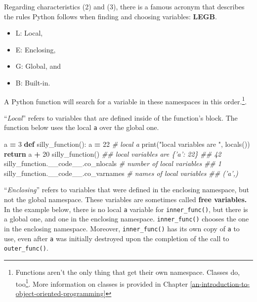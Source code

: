 \documentclass[12pt,krantz2]{krantz}
\makeatletter
\newenvironment{Shaded}{\begin{snugshade}}{\end{snugshade}}
\newcommand{\BuiltInTok}[1]{#1}
\newcommand{\CommentTok}[1]{\textcolor[rgb]{0.37,0.37,0.37}{\textit{#1}}}
\newcommand{\ControlFlowTok}[1]{\textcolor[rgb]{0.27,0.27,0.27}{\textbf{#1}}}
\newcommand{\DecValTok}[1]{\textcolor[rgb]{0.06,0.06,0.06}{#1}}
\newcommand{\KeywordTok}[1]{\textcolor[rgb]{0.27,0.27,0.27}{\textbf{#1}}}
\newcommand{\NormalTok}[1]{#1}
\newcommand{\OperatorTok}[1]{\textcolor[rgb]{0.43,0.43,0.43}{\textbf{#1}}}
\newcommand{\StringTok}[1]{\textcolor[rgb]{0.5,0.5,0.5}{#1}}
\providecommand{\tightlist}{%
  \setlength{\itemsep}{0pt}\setlength{\parskip}{0pt}}
\renewcommand{\href}[2]{#2\footnote{\url{#1}}}
\newenvironment{kframe}{%
\medskip{}
\setlength{\fboxsep}{.8em}
 \def\at@end@of@kframe{}%
 \ifinner\ifhmode%
  \def\at@end@of@kframe{\end{minipage}}%
  \begin{minipage}{\columnwidth}%
 \fi\fi%
 \def\FrameCommand##1{\hskip\@totalleftmargin \hskip-\fboxsep
 \colorbox{shadecolor}{##1}\hskip-\fboxsep
     \hskip-\linewidth \hskip-\@totalleftmargin \hskip\columnwidth}%
 \MakeFramed {\advance\hsize-\width
   \@totalleftmargin\z@ \linewidth\hsize
   \@setminipage}}%
 {\par\unskip\endMakeFramed%
 \at@end@of@kframe}
\renewenvironment{Shaded}{\begin{kframe}}{\end{kframe}}
\makeatother
\begin{document}
Regarding characteristics (2) and (3), there is a famous acronym that describes the rules Python follows when finding and choosing variables: \textbf{LEGB}.

\begin{itemize}
\tightlist
\item
  L: Local,
\item
  E: Enclosing,
\item
  G: Global, and
\item
  B: Built-in.
\end{itemize}

A Python function will search for a variable in these namespaces in this order.\footnote{Functions aren't the only thing that get their own namespace. \href{https://docs.python.org/3/tutorial/classes.html\#a-first-look-at-classes}{Classes do, too}. More information on classes is provided in Chapter \ref{an-introduction-to-object-oriented-programming}}.

``\emph{Local}'' refers to variables that are defined inside of the function's block. The function below uses the local \texttt{a} over the global one.

\begin{Shaded}
\begin{Highlighting}[]
\NormalTok{a }\OperatorTok{=} \DecValTok{3}
\KeywordTok{def}\NormalTok{ silly_function():}
\NormalTok{    a }\OperatorTok{=} \DecValTok{22} \CommentTok{# local a}
    \BuiltInTok{print}\NormalTok{(}\StringTok{"local variables are "}\NormalTok{, }\BuiltInTok{locals}\NormalTok{())}
    \ControlFlowTok{return}\NormalTok{ a }\OperatorTok{+} \DecValTok{20}
\NormalTok{silly_function()}
\CommentTok{## local variables are  \{'a': 22\}}
\CommentTok{## 42}
\NormalTok{silly_function.__code__.co_nlocals }\CommentTok{# number of local variables}
\CommentTok{## 1}
\NormalTok{silly_function.__code__.co_varnames }\CommentTok{# names of local variables}
\CommentTok{## ('a',)}
\end{Highlighting}
\end{Shaded}

``\emph{Enclosing}'' refers to variables that were defined in the enclosing namespace, but not the global namespace. These variables are sometimes called \textbf{free variables.} In the example below, there is no local \texttt{a} variable for \texttt{inner\_func()}, but there is a global one, and one in the enclosing namespace. \texttt{inner\_func()} chooses the one in the enclosing namespace. Moreover, \texttt{inner\_func()} has its own copy of \texttt{a} to use, even after \texttt{a} was initially destroyed upon the completion of the call to \texttt{outer\_func()}.
\end{document}
